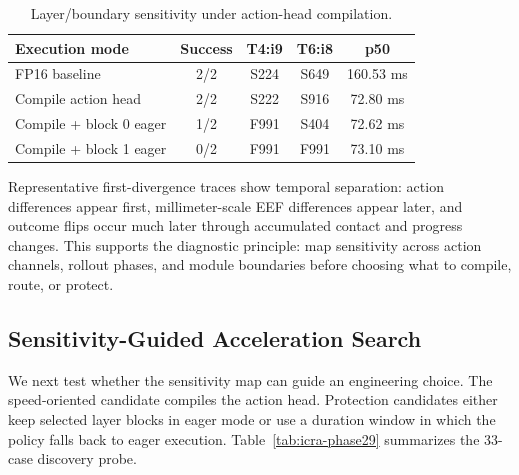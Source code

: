 \documentclass[letterpaper,10pt,twocolumn]{article}
\begin{document}
\begin{table}[H]
\centering
\caption{Layer/boundary sensitivity under action-head compilation.}
\label{tab:icra-boundary}
\scriptsize
\setlength{\tabcolsep}{2.5pt}
\begin{tabular}{lcccc}
\toprule
Execution mode & Success & T4:i9 & T6:i8 & p50 \\
\midrule
FP16 baseline & 2/2 & S224 & S649 & 160.53 ms \\
Compile action head & 2/2 & S222 & S916 & 72.80 ms \\
Compile + block 0 eager & 1/2 & F991 & S404 & 72.62 ms \\
Compile + block 1 eager & 0/2 & F991 & F991 & 73.10 ms \\
\bottomrule
\end{tabular}
\end{table}

Representative first-divergence traces show temporal separation: \mbox{action} differences appear first, millimeter-scale EEF differences appear later, and outcome flips occur much later through accumulated contact and progress changes. This supports the diagnostic principle: map sensitivity across action channels, rollout phases, and module boundaries before choosing what to compile, route, or protect.

\subsection{Sensitivity-Guided Acceleration Search}

We next test whether the sensitivity map can guide an engineering choice. The speed-oriented candidate compiles the action head. Protection candidates either keep selected layer blocks in eager mode or use a duration window in which the policy falls back to eager execution. Table~\ref{tab:icra-phase29} summarizes the 33-case discovery probe.
\end{document}
